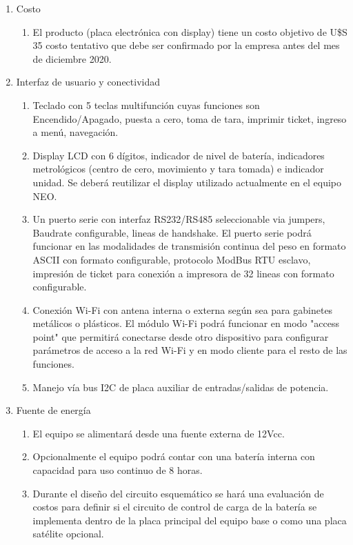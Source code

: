 \documentclass[11pt]{charter}
\begin{document}
\begin{enumerate}
\item Costo
	\begin{enumerate}
	\item El producto (placa electrónica con display) tiene un costo objetivo de U\$S 35 \color{red} costo tentativo que debe ser confirmado por la empresa antes del mes de diciembre 2020.
	\end{enumerate}
\item Interfaz de usuario y conectividad
	\begin{enumerate}
	\item Teclado con 5 teclas multifunción cuyas funciones son Encendido/Apagado, puesta a cero, toma de tara, imprimir ticket, ingreso a menú, navegación.
	\item Display LCD con 6 dígitos, indicador de nivel de batería, indicadores metrológicos (centro de cero, movimiento y tara tomada) e indicador unidad. Se deberá reutilizar el display utilizado actualmente en el equipo NEO.
	\item Un puerto serie con interfaz RS232/RS485 seleccionable via jumpers, Baudrate configurable, lineas de handshake. El puerto serie podrá funcionar en las modalidades de transmisión continua del peso en formato ASCII con formato configurable, protocolo ModBus RTU esclavo, impresión de ticket para conexión a impresora de 32 lineas con formato configurable. 
	\item Conexión Wi-Fi con antena interna o externa según sea para gabinetes metálicos o plásticos. El módulo Wi-Fi podrá funcionar en modo "access point" que permitirá conectarse desde otro dispositivo para configurar parámetros de acceso a la red Wi-Fi y en modo cliente para el resto de las funciones.
	\item Manejo vía bus I2C de placa auxiliar de entradas/salidas de potencia.
	\end{enumerate}
\item Fuente de energía
	\begin{enumerate}
	\item El equipo se alimentará desde una fuente externa de 12Vcc.
	\item Opcionalmente el equipo podrá contar con una batería interna con capacidad para uso continuo de 8 horas.
	\item Durante el diseño del circuito esquemático se hará una evaluación de costos para definir si el circuito de control de carga de la batería se implementa dentro de la placa principal del equipo base o como una placa satélite opcional. 

\end{enumerate}
\end{enumerate}
\end{document}

